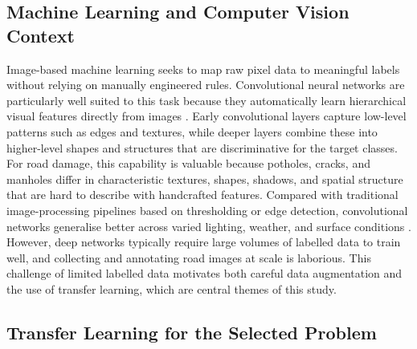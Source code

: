 \documentclass[preprint,12pt]{elsarticle}
\begin{document}
\subsection{Machine Learning and Computer Vision Context}

Image-based machine learning seeks to map raw pixel data to meaningful labels without relying on manually engineered rules.
Convolutional neural networks are particularly well suited to this task because they automatically learn hierarchical visual features directly from images \cite{nguyen2023survey}.
Early convolutional layers capture low-level patterns such as edges and textures, while deeper layers combine these into higher-level shapes and structures that are discriminative for the target classes.
For road damage, this capability is valuable because potholes, cracks, and manholes differ in characteristic textures, shapes, shadows, and spatial structure that are hard to describe with handcrafted features.
Compared with traditional image-processing pipelines based on thresholding or edge detection, convolutional networks generalise better across varied lighting, weather, and surface conditions \cite{nguyen2023survey}.
However, deep networks typically require large volumes of labelled data to train well, and collecting and annotating road images at scale is laborious.
This challenge of limited labelled data motivates both careful data augmentation and the use of transfer learning, which are central themes of this study.

\subsection{Transfer Learning for the Selected Problem}
\end{document}

